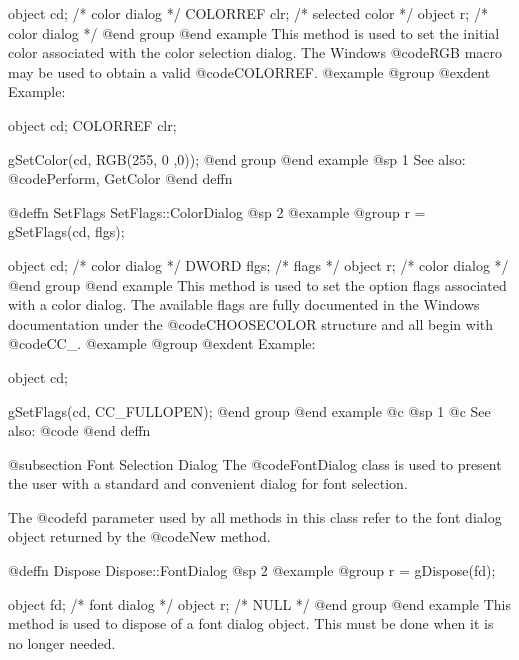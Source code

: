 object   cd;    /*  color dialog    */
COLORREF clr;   /*  selected color  */
object   r;     /*  color dialog    */
@end group
@end example
This method is used to set the initial color associated with the
color selection dialog.  The Windows @code{RGB} macro may be used
to obtain a valid @code{COLORREF}.
@example
@group
@exdent Example:

object  cd;
COLORREF clr;

gSetColor(cd, RGB(255, 0 ,0));
@end group
@end example
@sp 1
See also:  @code{Perform, GetColor}
@end deffn














@deffn {SetFlags} SetFlags::ColorDialog
@sp 2
@example
@group
r = gSetFlags(cd, flgs);

object  cd;     /*  color dialog  */
DWORD   flgs;   /*  flags         */
object  r;      /*  color dialog  */
@end group
@end example
This method is used to set the option flags associated with a color dialog.
The available flags are fully documented in the Windows documentation
under the @code{CHOOSECOLOR} structure and all begin with @code{CC_}.
@example
@group
@exdent Example:

object  cd;

gSetFlags(cd, CC_FULLOPEN);
@end group
@end example
@c @sp 1
@c See also:  @code{}
@end deffn











@subsection Font Selection Dialog
The @code{FontDialog} class is used to present the user with a standard
and convenient dialog for font selection.

The @code{fd} parameter used by all methods in this class refer to
the font dialog object returned by the @code{New} method.








@deffn {Dispose} Dispose::FontDialog
@sp 2
@example
@group
r = gDispose(fd);

object  fd;     /*  font dialog   */
object  r;      /*  NULL          */
@end group
@end example
This method is used to dispose of a font dialog object.  This must
be done when it is no longer needed.

